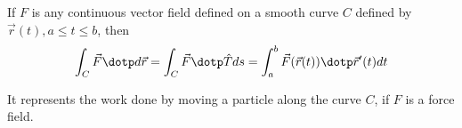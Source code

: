 \begin{definition}
  If $F$ is any continuous vector field defined on a smooth curve $C$ defined by $\vec{r}(t), a \leq t \leq b$, then
  \[
    \int_C \vec{F} \dotp d\vec{r} = \int_C \vec{F} \dotp \hat{T} ds = \int_a^b \vec{F}(\vec{r}(t)) \dotp \vec{r}'(t) dt
  \]

  It represents the work done by moving a particle along the curve $C$, if $F$ is a force field.
\end{definition}


